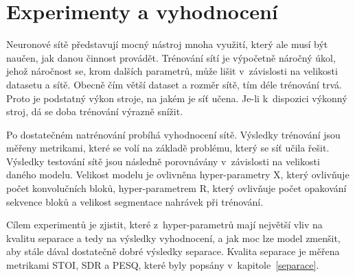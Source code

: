 





\chapter{Experimenty a vyhodnocení}
\label{experimenty}
Neuronové sítě představují mocný nástroj mnoha využití, který ale musí být naučen, jak danou činnost provádět. Trénování sítí je výpočetně náročný úkol, jehož náročnost se, krom dalších parametrů, může lišit v~závislosti na velikosti datasetu a sítě. Obecně čím větší dataset a rozměr sítě, tím déle trénování trvá. Proto je podstatný výkon stroje, na jakém je síť učena. Je-li k~dispozici výkonný stroj, dá se doba trénování výrazně snížit.

Po dostatečném natrénování probíhá vyhodnocení sítě. Výsledky trénování jsou měřeny metrikami, které se volí na základě problému, který se síť učila řešit. Výsledky testování sítě jsou následně porovnávány v~závislosti na velikosti daného modelu. Velikost modelu je ovlivněna hyper-parametry X, který ovlivňuje počet konvolučních bloků, hyper-parametrem R, který ovlivňuje počet opakování sekvence bloků a velikost segmentace nahrávek při trénování.

Cílem experimentů je zjistit, které z~hyper-parametrů mají největší vliv na kvalitu separace a tedy na výsledky vyhodnocení, a jak moc lze model zmenšit, aby stále dával dostatečně dobré výsledky separace. Kvalita separace je měřena metrikami STOI, SDR a PESQ, které byly popsány v~kapitole~\ref{separace}.


